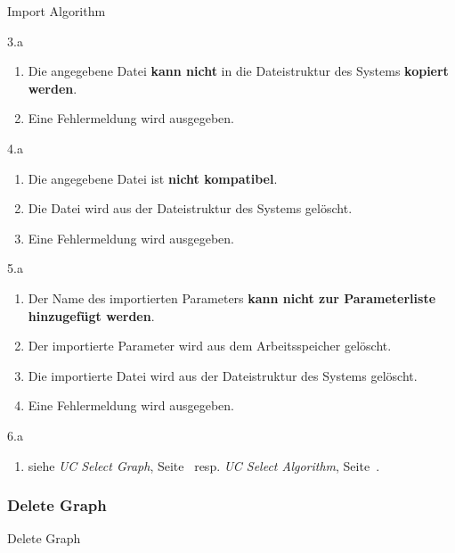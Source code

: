 \begin{usecase}{Import Algorithm}
{\begin{enumerate}
		    \end{enumerate}
	    \item[3.a]
		    \begin{enumerate}
			\item Die angegebene Datei \textbf{kann nicht} in die Dateistruktur des Systems \textbf{kopiert werden}.
			\item Eine Fehlermeldung wird ausgegeben.
		    \end{enumerate}
	    \item[4.a]
		    \begin{enumerate}
			\item Die angegebene Datei ist \textbf{nicht kompatibel}.
			\item Die Datei wird aus der Dateistruktur des Systems gel\"oscht.
			\item Eine Fehlermeldung wird ausgegeben.
		    \end{enumerate}
	    \item[5.a]
		    \begin{enumerate}
			\item Der Name des importierten Parameters \textbf{kann nicht zur Parameterliste hinzugef\"ugt werden}.
			\item Der importierte Parameter wird aus dem Arbeitsspeicher gel\"oscht.
			\item Die importierte Datei wird aus der Dateistruktur des Systems gel\"oscht.
			\item Eine Fehlermeldung wird ausgegeben.
		    \end{enumerate}
	    \item[6.a]
		    \begin{enumerate}
			\item siehe \textit{UC Select Graph}, Seite~\pageref{uc:Select Graph} resp. \textit{UC Select Algorithm}, Seite~\pageref{uc:Select Algorithm}.
		    \end{enumerate}
    }
\end{usecase}
\newpage 
% 
\subsubsection{Delete Graph}
\begin{usecase}{Delete Graph}
    \mainsuccess{
	    \item 
    }
    \extensions{
	    \item[1.a]
		    \begin{enumerate}
			\item 
		    \end{enumerate}
    }
\end{usecase}
\newpage 
% 
